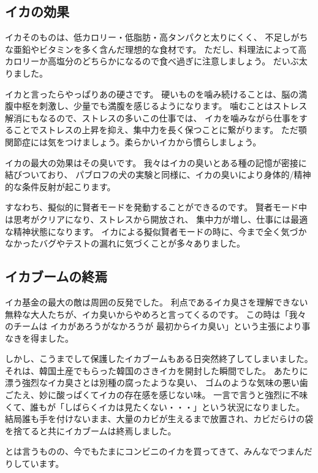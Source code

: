 \subsection{イカの効果}

イカそのものは、低カロリー・低脂肪・高タンパクと太りにくく、
不足しがちな亜鉛やビタミンを多く含んだ理想的な食材です。
ただし、料理法によって高カロリーか高塩分のどちらかになるので食べ過ぎに注意しましょう。
だいぶ太りました。

イカと言ったらやっぱりあの硬さです。
硬いものを噛み続けることは、脳の満腹中枢を刺激し、少量でも満腹を感じるようになります。
噛むことはストレス解消にもなるので、ストレスの多いこの仕事では、
イカを噛みながら仕事をすることでストレスの上昇を抑え、集中力を長く保つことに繋がります。
ただ顎関節症には気をつけましょう。柔らかいイカから慣らしましょう。

イカの最大の効果はその臭いです。
我々はイカの臭いとある種の記憶が密接に結びついており、
パブロフの犬の実験と同様に、イカの臭いにより身体的/精神的な条件反射が起こります。

すなわち、擬似的に賢者モードを発動することができるのです。
賢者モード中は思考がクリアになり、ストレスから開放され、
集中力が増し、仕事には最適な精神状態になります。
イカによる擬似賢者モードの時に、今まで全く気づかなかったバグやテストの漏れに気づくことが多々ありました。

\subsection{イカブームの終焉}

イカ基金の最大の敵は周囲の反発でした。
利点であるイカ臭さを理解できない無粋な大人たちが、イカ臭いからやめろと言ってくるのです。
この時は「我々のチームは イカがあろうがなかろうが
最初からイカ臭い」という主張により事なきを得ました。

しかし、こうまでして保護したイカブームもある日突然終了してしまいました。
それは、韓国土産でもらった韓国のさきイカを開封した瞬間でした。
あたりに漂う強烈なイカ臭さとは別種の腐ったような臭い、
ゴムのような気味の悪い歯ごたえ、妙に酸っぱくてイカの存在感を感じない味。
一言で言うと強烈に不味くて、誰もが「しばらくイカは見たくない・・・」という状況になりました。
結局誰も手を付けないまま、大量のカビが生えるまで放置され、カビだらけの袋を捨てると共にイカブームは終焉しました。

とは言うものの、今でもたまにコンビニのイカを買ってきて、みんなでつまんだりしています。

